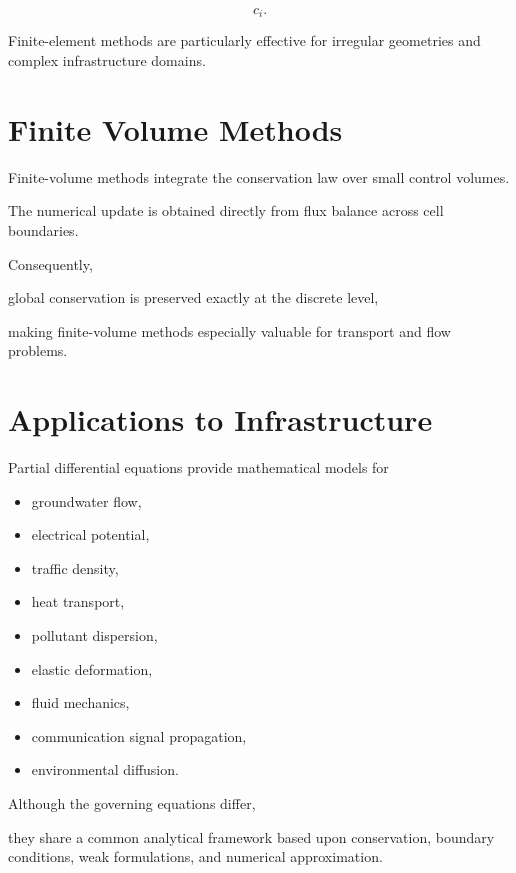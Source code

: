 \documentclass[11pt,fleqn]{book}
\numberwithin{equation}{chapter}
\theoremstyle{plain}
\theoremstyle{definition}
\theoremstyle{remark}
\begin{document}
\[
c_i.
\]

Finite-element methods are particularly effective for irregular
geometries and complex infrastructure domains.


\section{Finite Volume Methods}

Finite-volume methods integrate the conservation law over small control
volumes.

The numerical update is obtained directly from flux balance across cell
boundaries.

Consequently,

global conservation is preserved exactly at the discrete level,

making finite-volume methods especially valuable for transport and flow
problems.


\section{Applications to Infrastructure}

Partial differential equations provide mathematical models for

\begin{itemize}
\item groundwater flow,
\item electrical potential,
\item traffic density,
\item heat transport,
\item pollutant dispersion,
\item elastic deformation,
\item fluid mechanics,
\item communication signal propagation,
\item environmental diffusion.
\end{itemize}

Although the governing equations differ,

they share a common analytical framework based upon conservation,
boundary conditions,
weak formulations,
and numerical approximation.

\end{document}
